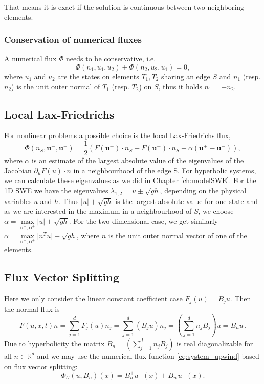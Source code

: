 \documentclass[a4paper,12pt]{article}
\theoremstyle{definition}
\theoremstyle{definition}
\newcommand{\Dim}{d}
\begin{document}
That means it is exact if the solution is continuous between two neighboring elements.

\subsubsection{Conservation of numerical fluxes}
A numerical flux $\Phi$ needs to be conservative, i.e. 
\begin{equation}
\Phi(n_1,u_1,u_2) + \Phi(n_2, u_2, u_1) = 0,
\end{equation}
where $u_1$ and $u_2$ are the states on elements $T_1, T_2$ sharing an edge $S$ and $n_1$ (resp. $n_2$) is the unit outer normal of $T_1$ (resp. $T_2$) on $S$, thus it holds $n_1 = -n_2$. 

\subsection{Local Lax-Friedrichs}

For nonlinear problems a possible choice is the local Lax-Friedrichs flux, 
\begin{equation}
\Phi (n_S, \mathbf{u}^-, \mathbf{u}^+) = \frac{1}{2}(F(\mathbf{u}^-)\cdot n_S + F(\mathbf{u}^+)\cdot n_S - \alpha (\mathbf{u}^+ -\mathbf{u}^- )),
\end{equation}
where $\alpha$ is an estimate of the largest absolute value of the eigenvalues of the Jacobian $\partial_u F(u)\cdot n$ in a neighbourhood of the edge S.
For hyperbolic systems, we can calculate these eigenvalues as we did in Chapter \ref{ch:modelSWE}.
For the 1D SWE we have the eigenvalues $\lambda_{1,2} = u \pm \sqrt{gh}$, depending on the physical variables $u$ and $h$.
Thus $\vert u \vert +\sqrt{gh}$ is the largest absolute value for one state and as we are interested in the maximum in a neighbourhood of $S$, we choose $\alpha = \max\limits_{\mathbf{u}^-, \mathbf{u}^+} \vert u \vert +\sqrt{gh}$.
For the two dimensional case, we get similarly $\alpha = \max\limits_{\mathbf{u}^-, \mathbf{u}^+} \vert n^Tu \vert +\sqrt{gh}$, where $n$ is the unit outer normal vector of one of the elements.


\subsection{Flux Vector Splitting}

Here we only consider the linear 
constant coefficient case $F_j(u) = B_j u$. Then the normal flux is
\begin{equation}
F(u,x,t)n = \sum_{j=1}^{\Dim} F_j(u) n_j = \sum_{j=1}^{\Dim} (B_j u) n_j
=\left( \sum_{j=1}^{\Dim} n_j B_j\right) u = B_n u \, .
\end{equation}
Due to hyperbolicity the matrix $B_n = \left( \sum_{j=1}^{\Dim} n_j B_j\right)$
is real diagonalizable for all $n\in\mathbb{R}^{\Dim}$ and we may use the numerical flux function
\eqref{eq:system_upwind} based on flux vector splitting:
\begin{equation}
\Phi_U(u,B_n)(x) = B_n^+ u^-(x) + B_n^- u^+(x) .
\end{equation}
\end{document}
